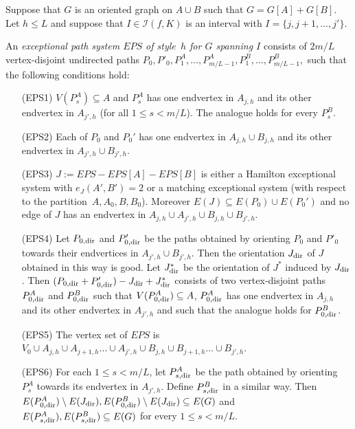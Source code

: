 \documentclass{memo-l}
\def\COMMENT#1{}
\numberwithin{section}{chapter}
\numberwithin{equation}{section}
\numberwithin{firstthm}{section}
\numberwithin{figure}{section}
\begin{document}
Suppose that $G$ is an oriented graph on $A \cup B$ such that $G = G[A] +G[B]$.
Let $h\le L$ and suppose that $I \in \mathcal{I}(f,K)$ is an interval with $I=\{j,j+1, \dots, j'\}$.%
   \COMMENT{Daniela: added brackets}
An \emph{exceptional path system $EPS$ of style~$h$ for $G$ spanning $I$}
consists of $2 m/L$ vertex-disjoint undirected paths $P_0, P'_0 , P_1^A, \dots,P_{m/L-1}^A, P_1^B, \dots,P_{m/L-1}^B,$
such that the following conditions hold:
\begin{enumerate}
\item[(EPS1)] $V(P_s^A)\subseteq A$ and $P_s^A$ has one endvertex in $A_{j,h}$ and its other endvertex in $A_{j',h}$ (for all $1 \le s < m/L$).
The analogue holds for every $P_s^B$.%
\COMMENT{So no edges of the exceptional system $J$ are contained in $P_s^A$ and $P_s^B$ for $ 1 \le s < m/L$.}
\item[(EPS2)] Each of $P_0$ and $P_0'$ has one endvertex in $A_{j,h} \cup B_{j,h}$ and its other endvertex in $A_{j',h} \cup B_{j',h}$.%
	\COMMENT{We can fix $P_0$ to have one endvertex in $A_{j,h}$ (and $P'_0$ to have one endvertex in $B_{j,h}$). However, the other endvertex of $P_0$ depends on the exceptional system.
	If $J$ is a Hamilton exceptional system, then the other endvertex of $P_0$ is in $B_{j',h}$.
	Otherwise (i.e.~$J$ is a matching exceptional system) the other endvertex of $P_0$ is in $A_{j',h}$.}
\item[(EPS3)] $J:= EPS - EPS[A] - EPS[B]$ is either a Hamilton exceptional system with $e_J ( A',B')=2$
or a matching exceptional system (with respect to the partition~$A,A_0,B,B_0$).
Moreover $E(J)\subseteq E(P_0) \cup E(P_{0}')$ and no edge of $J$ has an endvertex in $A_{j,h}\cup A_{j',h}\cup B_{j,h}\cup B_{j',h}$.
\item[(EPS4)] Let $P_{0,{\rm dir}}$ and $P'_{0,{\rm dir}}$ be the paths obtained by orienting $P_0$ and $P'_0$ towards their
endvertices in $A_{j',h} \cup  B_{j',h}$. Then the orientation $J_{\rm dir}$ of $J$ obtained in this way is good. 
Let $J^*_{\rm dir}$ be the orientation of $J^*$ induced by $J_{\rm dir}$.
Then $(P_{0,{\rm dir}} + P'_{0,{\rm dir}})-J_{\rm dir}+J^*_{\rm dir}$ consists of two vertex-disjoint paths $P^A_{0,{\rm dir}}$
and $P^B_{0,{\rm dir}}$ such that $V(P_{0,{\rm dir}}^A)\subseteq A$, $P_{0,{\rm dir}}^A$ has one endvertex in $A_{j,h}$ and its other endvertex in $A_{j',h}$ and
such that the analogue holds for $P^B_{0, {\rm dir} }$.
\item[(EPS5)] The vertex set of $EPS$ is $V_0\cup A_{j,h} \cup A_{j+1,h} \dots \cup A_{j',h} \cup B_{j,h} \cup B_{j+1,h} \dots \cup B_{j',h}$.
\item[(EPS6)] For each $1 \le s < m/L$, let $P^A_{s,{\rm dir}}$ be the path obtained by orienting $P^A_s$ towards its endvertex in $A_{j',h}$.
Define $P^B_{s,{\rm dir}}$ in a similar way. Then
$E(P^A_{0,{\rm dir}})\setminus E(J_{\rm dir}), E(P^B_{0,{\rm dir}})\setminus E(J_{\rm dir}) \subseteq E(G)$
and $E(P^A_{s,{\rm dir}}), E(P^B_{s,{\rm dir}})\subseteq E(G)$ for every $1\le s < m/L$.  
\end{enumerate}
\end{document}
